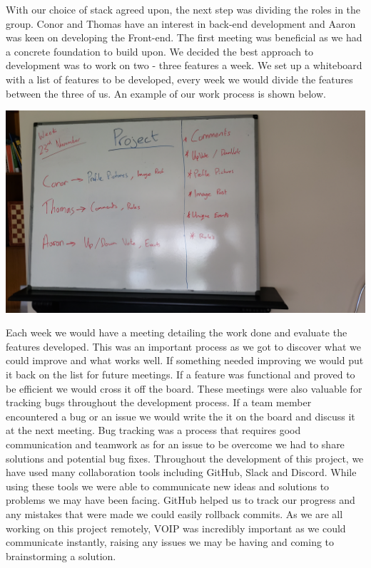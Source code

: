 \begin{itemize}
With our choice of stack agreed upon, the next step was dividing the roles in the group. Conor and Thomas have an interest in back-end development and Aaron was keen on developing the Front-end. The first meeting was beneficial as we had a concrete foundation to build upon. \newline
We decided the best approach to development was to work on two - three features a week. We set up a whiteboard with a list of features to be developed, every week we would divide the features between the three of us. An example of our work process is shown below.
\begin{center}
  \includegraphics[scale=0.09]{img/whiteboard.jpg}
\end{center}
Each week we would have a meeting detailing the work done and evaluate the features developed. This was an important process as we got to discover what we could improve and what works well. If something needed improving we would put it back on the list for future meetings. If a feature was functional and proved to be efficient we would cross it off the board. \newline
These meetings were also valuable for tracking bugs throughout the development process. If a team member encountered a bug or an issue we would write the it on the board and discuss it at the next meeting. Bug tracking was a process that requires good communication and teamwork as for an issue to be overcome we had to share solutions and potential bug fixes. 
\newline
Throughout the development of this project, we have used many collaboration tools including GitHub, Slack and Discord. While using these tools we were able to communicate new ideas and solutions to problems we may have been facing. GitHub helped us to track our progress and any mistakes that were made we could easily rollback commits. As we are all working on this project remotely, VOIP was incredibly important as we could communicate instantly, raising any issues we may be having and coming to brainstorming a solution.

\end{itemize}
